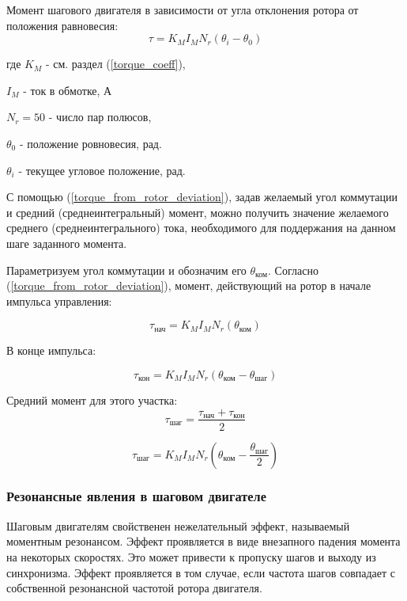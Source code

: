 Момент шагового двигателя в зависимости от угла отклонения ротора от положения равновесия:
\begin{equation}
    \label{torque_from_rotor_deviation}
    \tau = K_{M} I_{M} N_{r} ( \theta_{i} - \theta_{0} )
\end{equation}

где $K_{M}$ - см. раздел (\ref{torque_coeff}),

$I_{M}$ - ток в обмотке, А

$N_{r} = 50$ - число пар полюсов,

$\theta_{0}$ - положение ровновесия, рад.

$\theta_{i}$ - текущее угловое положение, рад.

С помощью (\ref{torque_from_rotor_deviation}), задав желаемый угол коммутации и
средний (среднеинтегральный) момент, можно получить значение желаемого среднего
(среднеинтегрального) тока, необходимого для поддержания на данном шаге заданного момента.

Параметризуем угол коммутации и обозначим его $\theta_{\textit{ком}}$.
Согласно (\ref{torque_from_rotor_deviation}), момент, действующий на ротор
в начале импульса управления:

\begin{equation}
    \label{moment_to_rotor_at_the_begin_of_control_pulse}
    \tau_{\textit{нач}} = K_{M} I_{M} N_{r} ( \theta_{\textit{ком}} )
\end{equation}

В конце импульса:

\begin{equation}
    \label{moment_to_rotor_at_the_end_of_control_pulse}
    \tau_{\textit{кон}} = K_{M} I_{M} N_{r} ( \theta_{\textit{ком}} - \theta_{\textit{шаг}} )
\end{equation}

Средний момент для этого участка:
$$
    \tau_{\textit{шаг}} = \frac{ \tau_{\textit{нач}} + \tau_{\textit{кон}} }{ 2 }
$$

\begin{equation}
    \label{eq_average_moment_to_rotor_on_control_pulse}
    \tau_{\textit{шаг}} = K_{M} I_{M} N_{r} ( \theta_{\textit{ком}} - \frac{ \theta_{\textit{шаг}} }{ 2 } )
\end{equation}

\subsubsection{Резонансные явления в шаговом двигателе}
Шаговым двигателям свойственен нежелательный эффект, называемый моментным резонансом. Эффект
проявляется в виде внезапного падения момента на некоторых скоростях. Это может привести к пропуску
шагов и выходу из синхронизма. Эффект проявляется в том случае, если частота шагов совпадает с
собственной резонансной частотой ротора двигателя.

